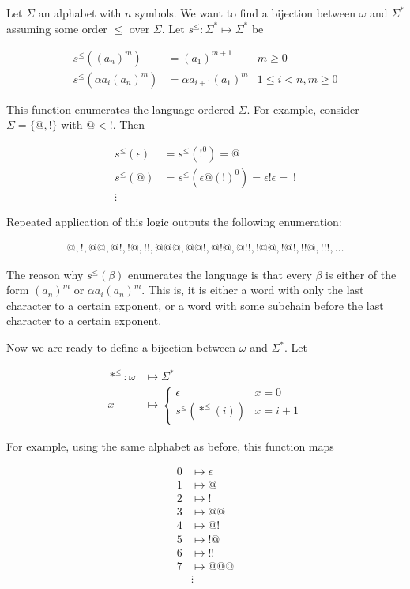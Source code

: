 \documentclass[a4paper, 12pt]{article}
\begin{document}
Let $\Sigma$ an alphabet with $n$ symbols. We want to find a bijection between $\omega$ and
$\Sigma^{*}$ assuming some order $\leq$ over $\Sigma$. Let $s^{\leq} :
\Sigma^{*} \mapsto \Sigma^{*}$ be


\begin{align*}
    s^{\leq} \left( (a_n)^m \right)  &= (a_1)^{m + 1} & m \geq 0\\ 
    s^{\leq} \left( \alpha a_i (a_n)^{m} \right) &= \alpha a_{i+1} (a_1)^{m} & 1
    \leq i < n, m \geq 0
\end{align*}

This function enumerates the language ordered $\Sigma$. For example, consider
$\Sigma = \{@, !\}$ with $@ < !$. Then 

\begin{align*}
    s^{\leq}( \epsilon ) &= s^{\leq}( !^{0} ) = @\\
    s^{\leq}( @ ) &= s^{\leq}( \epsilon @ (!)^{0} ) = \epsilon ! \epsilon = ~!
    \\ 
    \vdots
\end{align*}

Repeated application of this logic outputs the following enumeration: 

\begin{align*}
    @, !, @@, @!, !@, !!, @@@, @@!, @!@, @!!, !@@, !@!, !!@, !!!, \ldots
\end{align*}

The reason why $s^{\leq}( \beta  )$ enumerates the language is that every $\beta
$ is either of the form $(a_n)^{m}$ or $\alpha a_i (a_n)^{m}$. This is, it is
either a word with only the last character to a certain exponent, or a word with
some subchain before the last character to a certain exponent.

Now we are ready to define a bijection between $\omega$ and $\Sigma^{*}$. Let 

\begin{align*}
    *^{\leq} : \omega &\mapsto \Sigma^{*} \\ 
    x &\mapsto \begin{cases}
        \epsilon & x = 0 \\ 
        s^{\leq} \left( *^{\leq} \left( i \right)  \right) & x = i + 1
    \end{cases}
\end{align*}

For example, using the same alphabet as before, this function maps 

\begin{align*}
    0 &\mapsto \epsilon \\ 
    1 &\mapsto @ \\ 
    2 &\mapsto ! \\ 
    3 &\mapsto @@ \\ 
    4 &\mapsto @! \\ 
    5 &\mapsto !@ \\ 
    6 &\mapsto  !! \\ 
    7 &\mapsto  @@@ \\ 
      &\vdots
\end{align*}
\end{document}
